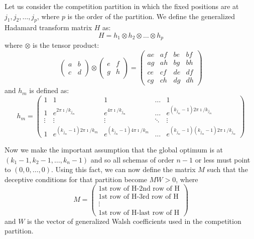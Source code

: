 Let us consider the competition partition in which the fixed positions
are at $j_1,j_2,\ldots,j_p$, where $p$ is the order of the partition.
We define the generalized Hadamard transform matrix $H$ as: 
\begin{equation} 
H=h_1 \otimes h_2 \otimes \ldots \otimes h_p
\end{equation}
where $\otimes$ is the tensor product:
\begin{equation}
\left(\begin{array}{cc}
	a & b\\
	c & d
	\end{array} \right)
\otimes \left(\begin{array}{cc}
	e & f\\
	g &h
	\end{array} \right)
= \left(\begin{array}{cccc}
	ae& af& be& bf\\
	ag& ah& bg& bh \\
	ce& cf& de& df \\
	cg& ch& dg& dh
\end{array}\right)
\end{equation}
and $h_m$ is defined as:
\begin{equation}
h_m = \left(\begin{array}{ccccc}
		1 & 1& 1& \ldots &1 \\
		1 & e^{2 \pi \imath /k_{j_m}} & e^{4 \pi \imath/k_{j_m}} &\ldots &
			e^{(k_{j_m}-1) 2 \pi \imath/k_{j_m}} \\
		\vdots &\vdots &\vdots &\ddots &\vdots \\
		1 & e^{(k_{j_m}-1) 2 \pi \imath/k_m} &
			e^{(k_{j_m}-1) 4 \pi \imath/k_m} &\ldots&
			e^{(k_{j_m}-1) (k_{j_m}-1) 2 \pi \imath/k_{j_m}}
	\end{array}
	\right)
\end{equation}

Now we make the important assumption that the global optimum is at
$(k_1-1,k_2-1,\ldots,k_n-1)$ and so all schemas of order $n-1$ or less
must point to $(0,0,\ldots,0)$.  Using this fact, we can now define the
matrix $M$ such that the deceptive conditions for that partition become
$M W>0$, where
\begin{equation}
M= \left(\begin{array}{c}
	\mbox{1st row of H-2nd row of H} \\
	\mbox{1st row of H-3rd row of H} \\
	\vdots \\
	\mbox{1st row of H-last row of H}
	\end{array}
	\right)
\end{equation}
and $W$ is the vector of generalized Walsh coefficients used in the
competition partition.

